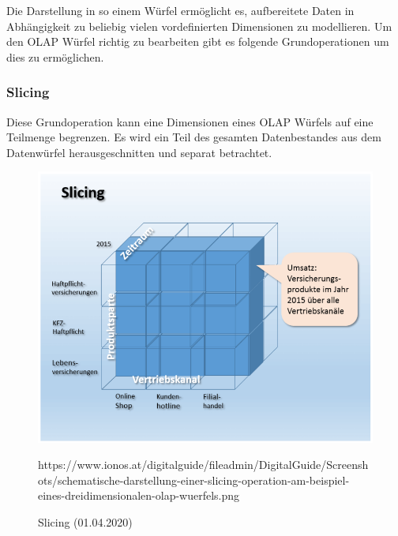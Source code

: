 Die Darstellung in so einem Würfel ermöglicht es, aufbereitete Daten in Abhängigkeit zu beliebig vielen vordefinierten Dimensionen zu modellieren. Um den OLAP Würfel richtig zu bearbeiten gibt es folgende Grundoperationen um dies zu ermöglichen.

\subsubsection{Slicing}\label{ssec:Slicing}
Diese Grundoperation kann eine Dimensionen eines OLAP Würfels auf eine Teilmenge begrenzen. Es wird ein Teil des gesamten Datenbestandes aus dem Datenwürfel herausgeschnitten und separat betrachtet.
\begin{figure}[H]
\centering
  \includegraphics[scale=0.4]{images/Slicing.png}
  \caption[Slicing (01.04.2020)]{Slicing (01.04.2020)}
  {https://www.ionos.at/digitalguide/fileadmin/DigitalGuide/Screenshots/schematische-darstellung-einer-slicing-operation-am-beispiel-eines-dreidimensionalen-olap-wuerfels.png}
  \label{fig:Slicing}
\end{figure}
\newpage
